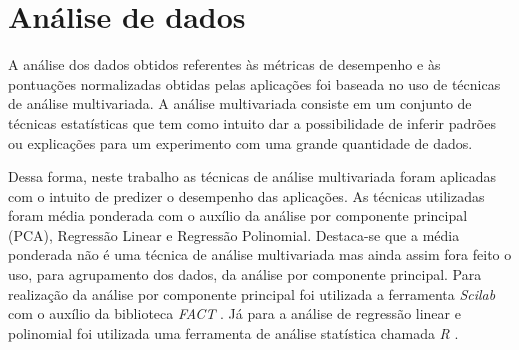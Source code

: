 \documentclass[[10pt,journal]{IEEEtran}
\begin{document}
\section{Análise de dados}

A análise dos dados obtidos referentes às métricas de desempenho e às pontuações normalizadas obtidas pelas aplicações foi baseada no uso de técnicas de análise multivariada. A análise multivariada consiste em um conjunto de técnicas estatísticas que tem como intuito dar a possibilidade de inferir padrões ou explicações para um experimento com uma grande quantidade de dados. %
  
  
  
  

Dessa forma, neste trabalho as técnicas de análise multivariada foram aplicadas com o intuito de predizer o desempenho das aplicações. As técnicas utilizadas foram média ponderada com o auxílio da análise por componente principal (PCA), Regressão Linear e Regressão Polinomial. Destaca-se que a média ponderada não é uma técnica de análise multivariada mas ainda assim fora feito o uso, para agrupamento dos dados, da análise por componente principal. Para realização da análise por componente principal foi utilizada a ferramenta \textit{Scilab} \footnotemark[9] com o auxílio da biblioteca \textit{FACT} \footnotemark[10]. Já para a análise de regressão linear e polinomial foi utilizada uma ferramenta de análise statística chamada \textit{R} \footnotemark[11].
\end{document}
